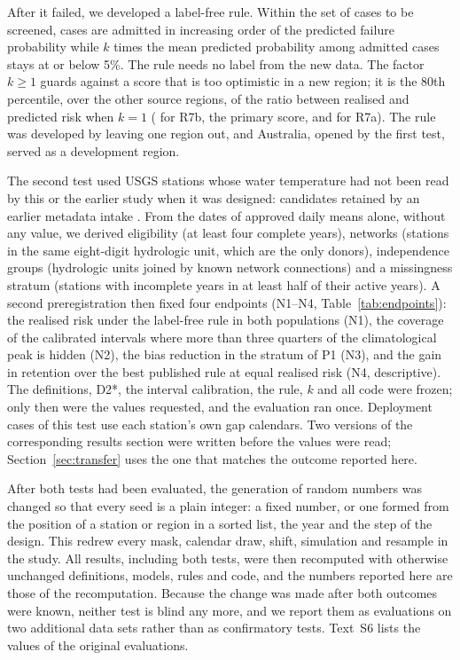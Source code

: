 \documentclass[draft]{agujournal2025}
\begin{document}
After it failed, we developed a label-free rule. Within the set of cases to be screened, cases are admitted in increasing order of the predicted failure probability while $k$ times the mean predicted probability among admitted cases stays at or below 5\%. The rule needs no label from the new data. The factor $k \geq 1$ guards against a score that is too optimistic in a new region; it is the 80th percentile, over the other source regions, of the ratio between realised and predicted risk when $k=1$ (\TErFactor{} for R7b, the primary score, and \TErFactorA{} for R7a). The rule was developed by leaving one region out, and Australia, opened by the first test, served as a development region.

The second test used USGS stations whose water temperature had not been read by this or the earlier study when it was designed: \TNewCandidates{} candidates retained by an earlier metadata intake \cite{usgsogc2026}. From the dates of approved daily means alone, without any value, we derived eligibility (at least four complete years), networks (stations in the same eight-digit hydrologic unit, which are the only donors), independence groups (hydrologic units joined by known network connections) and a missingness stratum (stations with incomplete years in at least half of their active years). A second preregistration then fixed four endpoints (N1--N4, Table~\ref{tab:endpoints}): the realised risk under the label-free rule in both populations (N1), the coverage of the calibrated intervals where more than three quarters of the climatological peak is hidden (N2), the bias reduction in the stratum of P1 (N3), and the gain in retention over the best published rule at equal realised risk (N4, descriptive). The definitions, D2*, the interval calibration, the rule, $k$ and all code were frozen; only then were the values requested, and the evaluation ran once. Deployment cases of this test use each station's own gap calendars. Two versions of the corresponding results section were written before the values were read; Section~\ref{sec:transfer} uses the one that matches the outcome reported here.



After both tests had been evaluated, the generation of random numbers was changed so that every seed is a plain integer: a fixed number, or one formed from the position of a station or region in a sorted list, the year and the step of the design. This redrew every mask, calendar draw, shift, simulation and resample in the study. All results, including both tests, were then recomputed with otherwise unchanged definitions, models, rules and code, and the numbers reported here are those of the recomputation. Because the change was made after both outcomes were known, neither test is blind any more, and we report them as evaluations on two additional data sets rather than as confirmatory tests. Text~S6 lists the values of the original evaluations.
\end{document}
